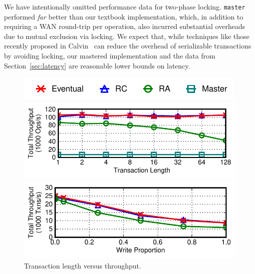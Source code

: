 We have intentionally omitted performance data for two-phase
locking. \texttt{master} performed \textit{far} better than our
textbook implementation, which, in addition to requiring a WAN
round-trip per operation, also incurred substantial overheads due to
mutual exclusion via locking. We expect that, while techniques like
those recently proposed in Calvin~\cite{calvin} can reduce the
overhead of serializable transactions by avoiding locking, our
mastered implementation and the data from Section~\ref{sec:latency}
are reasonable lower bounds on latency.

\begin{figure}[t!]
\begin{center}
\hspace{2em}\includegraphics[width=.8\columnwidth]{figs/strategylegend.pdf}\vspace{-2em}
\end{center}
\begin{center}
\includegraphics[width=\figfactor\columnwidth]{figs/finals/txnlen-thru.pdf}
\end{center}\vspace{-2.25em}
\caption{Transaction length versus throughput.}\vspace{-1em}
\label{fig:txlen}
\begin{center}
\includegraphics[width=\figfactor\columnwidth]{figs/finals/wprop-thru.pdf}
\end{center}\vspace{-2.25em}

\end{figure}
